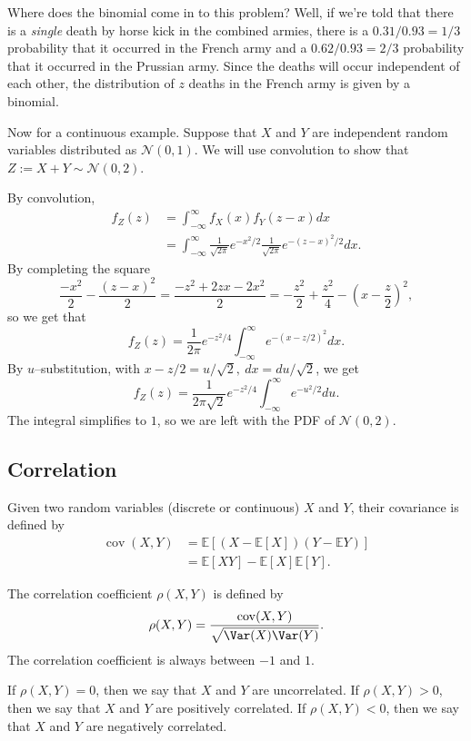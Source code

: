 \documentclass{ximera}
\begin{document}
\begin{example}
Where does the binomial come in to this problem? Well, if we're told that there is a \textit{single} death by horse kick in the combined armies, there is a $0.31/0.93=1/3$ probability that it occurred in the French army and a $0.62/0.93=2/3$ probability that it occurred in the Prussian army. Since the deaths will occur independent of each other, the distribution of $z$ deaths in the French army is given by a binomial.
\end{example}

\begin{example}
Now for a continuous example. Suppose that $X$ and $Y$ are independent random variables distributed as $\mathcal{N}(0,1)$. We will use convolution to show that $Z:=X+Y \sim \mathcal{N}(0,2)$.

By convolution,
\begin{align*}
f_Z(z) &= \int_{-\infty}^{\infty} f_X(x) f_Y(z-x) dx \\
&= \int_{-\infty}^{\infty} \frac{1}{\sqrt{2 \pi}} e^{-x^2/2} \frac{1}{ \sqrt{2\pi}} e^{-(z-x)^2/2} dx.
\end{align*}
By completing the square
$$
\frac{-x^2}{2} - \frac{(z-x)^2}{2} = \frac{-z^2 + 2zx -2x^2}{2} = - \frac{z^2}{2} + \frac{z^2}{4} - \left( x- \frac{z}{2}\right)^2,
$$
so we get that
$$
f_Z(z) = \frac{1}{2\pi} e^{-z^2/4} \int_{-\infty}^{\infty} e^{-(x-z/2)^2} dx.
$$
By $u$--substitution, with $x-z/2 = u/\sqrt{2}, \ dx=du/\sqrt{2}$, we get
$$
f_Z(z) = \frac{1}{2\pi \sqrt{2}} e^{-z^2/4} \int_{-\infty}^{\infty} e^{-u^2/2} du .
$$
The integral simplifies to $1$, so we are left with the PDF of $\mathcal{N}(0,2)$.
\end{example}
\subsection{Correlation}
\begin{definition}
Given two random variables (discrete or continuous) $X$ and $Y$, their covariance is defined by 
\begin{equation*}
\begin{aligned} \operatorname{cov}(X,Y) &=\mathbb{E}[(X-\mathbb{E} [X])(Y-\mathbb{E} Y)] \\ &=\mathbb{E}[XY]-\mathbb{E}[X] \mathbb{E}[Y] .\end{aligned}
\end{equation*}

The correlation coefficient $\rho(X,Y)$ is defined by 
$$
\rho(X,Y)  = \frac{\mathrm{cov}(X,Y)}{\sqrt{ \Var(X) \Var(Y) }}.
$$
The correlation coefficient is always between $-1$ and $1$.

If $\rho(X,Y)=0$, then we say that $X$ and $Y$ are uncorrelated. If $\rho(X,Y) >0$, then we say that $X$ and $Y$ are positively correlated. If $\rho(X,Y)<0$, then we say that $X$ and $Y$ are negatively correlated.
\end{definition}
\end{document}
